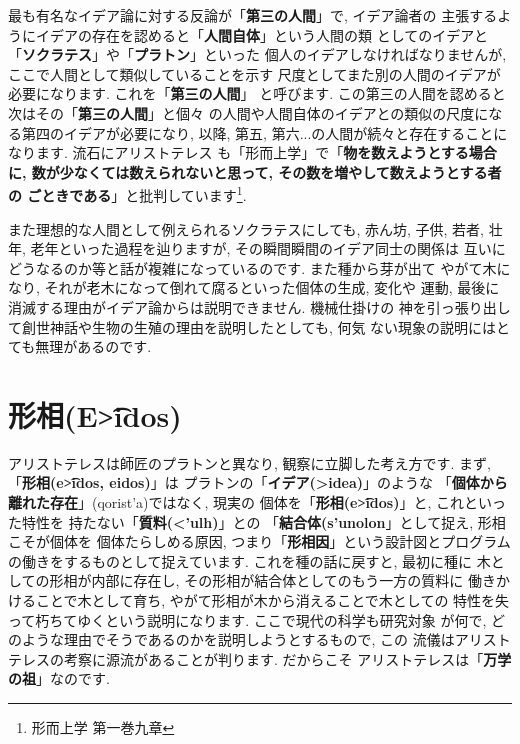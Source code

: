 \documentclass[b5j,8pt,twocolumn]{ltjsarticle}
\newcommand{\textgreek}[1]{\begingroup\fontencoding{LGR}\selectfont#1\endgroup}
\begin{document}
最も有名なイデア論に対する反論が「\textbf{第三の人間}」で, イデア論者の
主張するようにイデアの存在を認めると「\textbf{人間自体}」という人間の類
としてのイデアと「\textbf{ソクラテス}」や「\textbf{プラトン}」といった
個人のイデアしなければなりませんが, ここで人間として類似していることを示す
尺度としてまた別の人間のイデアが必要になります. これを「\textbf{第三の人間}」
と呼びます. この第三の人間を認めると次はその「\textbf{第三の人間}」と個々
の人間や人間自体のイデアとの類似の尺度になる第四のイデアが必要になり, 以降,
 第五, 第六...の人間が続々と存在することになります.  流石にアリストテレス
も「形而上学」\cite{アリストテレス2}で「\textbf{物を数えようとする場合に,
 数が少なくては数えられないと思って, その数を増やして数えようとする者の
ごときである}」と批判しています\cite{アリストテレス2}\footnote{形而上学
 第一巻九章}.
\newline


また理想的な人間として例えられるソクラテスにしても, 赤ん坊, 子供, 若者,
 壮年, 老年といった過程を辿りますが, その瞬間瞬間のイデア同士の関係は
互いにどうなるのか等と話が複雑になっているのです. また種から芽が出て
やがて木になり, それが老木になって倒れて腐るといった個体の生成, 変化や
運動, 最後に消滅する理由がイデア論からは説明できません. 機械仕掛けの
神を引っ張り出して創世神話や生物の生殖の理由を説明したとしても, 何気
ない現象の説明にはとても無理があるのです.


\section{形相(\textgreek{E\t{>i}dos})}

アリストテレスは師匠のプラトンと異なり, 観察に立脚した考え方です.
 まず, 「\textbf{\textbf{形相(\textgreek{e\t{>i}dos}, eidos)}}」は
プラトンの「\textbf{イデア(\textgreek{>idea})}」のような
「\textbf{個体から離れた存在}」(\textgreek{qorist'a})ではなく, 現実の
個体を「\textbf{形相(\textgreek{e\t{>i}dos})}」と, これといった特性を
持たない「\textbf{質料(\textgreek{<'ulh})}」との
「\textbf{結合体(\textgreek{s'unolon}}」として捉え, 形相こそが個体を
個体たらしめる原因, つまり「\textbf{形相因}」という設計図とプログラム
の働きをするものとして捉えています. これを種の話に戻すと, 最初に種に
木としての形相が内部に存在し, その形相が結合体としてのもう一方の質料に
働きかけることで木として育ち, やがて形相が木から消えることで木としての
特性を失って朽ちてゆくという説明になります. ここで現代の科学も研究対象
が何で, どのような理由でそうであるのかを説明しようとするもので, この
流儀はアリストテレスの考察に源流があることが判ります. だからこそ
アリストテレスは「\textbf{万学の祖}」なのです.
\newline
\end{document}
